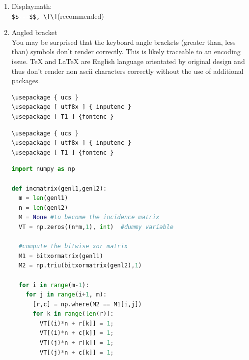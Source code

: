 \documentclass[12pt,a4paper]{report}
\begin{document}
\begin{enumerate}
\item Displaymath:\\
\verb|$$---$$, \[\]|(recommended)

\item Angled bracket\\
You may be surprised that the keyboard angle brackets (greater than, less than) symbols 
don't render correctly. This is likely traceable to an encoding issue. TeX and LaTeX are 
English language orientated by original design and thus don't render non ascii characters
correctly without the use of additional packages.
\begin{verbatim}
\usepackage { ucs } 
\usepackage [ utf8x ] { inputenc } 
\usepackage [ T1 ] {fontenc }
\end{verbatim}


\begin{lstlisting}[language={[LaTeX]TeX}, style=latex]
\usepackage { ucs } 
\usepackage [ utf8x ] { inputenc } 
\usepackage [ T1 ] {fontenc }
\end{lstlisting}



\begin{lstlisting}[language=Python]
import numpy as np

def incmatrix(genl1,genl2):
  m = len(genl1)
  n = len(genl2)
  M = None #to become the incidence matrix
  VT = np.zeros((n*m,1), int)  #dummy variable
  
  #compute the bitwise xor matrix
  M1 = bitxormatrix(genl1)
  M2 = np.triu(bitxormatrix(genl2),1) 
  
  for i in range(m-1):
    for j in range(i+1, m):
      [r,c] = np.where(M2 == M1[i,j])
      for k in range(len(r)):
        VT[(i)*n + r[k]] = 1;
        VT[(i)*n + c[k]] = 1;
        VT[(j)*n + r[k]] = 1;
        VT[(j)*n + c[k]] = 1;
  

\end{lstlisting}
\end{enumerate}
\end{document}
